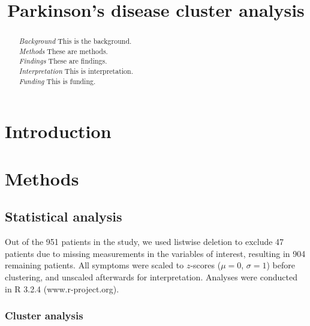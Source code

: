 \documentclass[preprint,5p]{elsarticle} %
\begin{document}
\begin{frontmatter}
\title{Parkinson's disease cluster analysis}

\begin{abstract}
\emph{Background} \quad This is the background. \\
\emph{Methods} \quad  These are methods. \\
\emph{Findings} \quad These are findings. \\
\emph{Interpretation} \quad This is interpretation. \\
\emph{Funding} \quad This is funding.
\end{abstract}
\end{frontmatter}


\section{Introduction}

\section{Methods}

\subsection{Statistical analysis}

Out of the 951 patients in the study, we used listwise deletion to exclude 47 patients due to
missing measurements in the variables of interest, resulting in 904 remaining patients. All
symptoms were scaled to $z$-scores ($\mu = 0$, $\sigma = 1$) before clustering, and unscaled
afterwards for interpretation. Analyses were conducted in R 3.2.4 (www.r-project.org).

\subsubsection{Cluster analysis}
\end{document}
